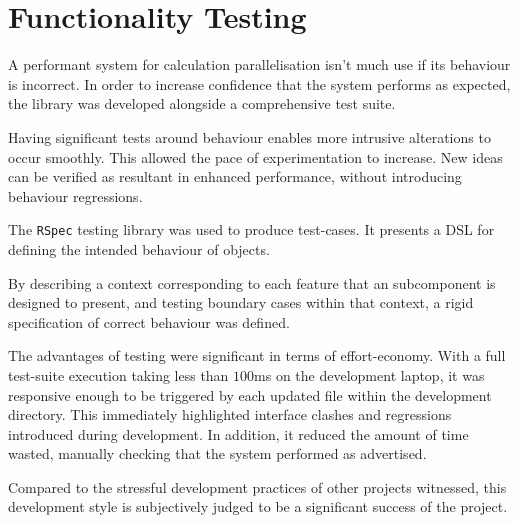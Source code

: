 \section{Functionality Testing}
A performant system for calculation parallelisation isn't much use if its behaviour is incorrect. In order to increase confidence that the system performs as expected, the library was developed alongside a comprehensive test suite.

Having significant tests around behaviour enables more intrusive alterations to occur smoothly. This allowed the pace of experimentation to increase. New ideas can be verified as resultant in enhanced performance, without introducing behaviour regressions.

The \verb|RSpec|\cite{rspec} testing library was used to produce test-cases. It presents a \ac{DSL} for defining the intended behaviour of objects.

By describing a context corresponding to each feature that an subcomponent is designed to present, and testing boundary cases within that context, a rigid specification of correct behaviour was defined.

The advantages of testing were significant in terms of effort-economy. With a full test-suite execution taking less than $100$ms on the development laptop, it was responsive enough to be triggered by each updated file within the development directory. This immediately highlighted interface clashes and regressions introduced during development. In addition, it reduced the amount of time wasted, manually checking that the system performed as advertised.

Compared to the stressful development practices of other projects witnessed, this development style is subjectively judged to be a significant success of the project.
